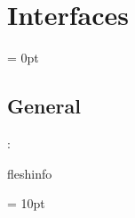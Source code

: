 
\section{Interfaces} 


\parskip = 0pt

\vspace{3mm} \subsection*{General}

: 

fleshinfo
\vspace{2mm}

\vspace{5mm}\parskip = 10pt 
